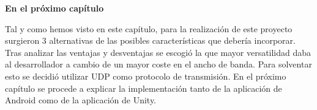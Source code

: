 \bigskip
\Large{\textbf{En el pr\'oximo cap\'itulo}}\\
\normalsize


Tal y como hemos visto en este cap\'itulo, para la realizaci\'on de este proyecto surgieron 3 alternativas de las posibles caracter\'isticas que deber\'ia incorporar. Tras analizar las ventajas y desventajas se escogi\'o la que mayor versatilidad daba al desarrollador a cambio de un mayor coste en el ancho de banda. Para solventar esto se decidi\'o utilizar UDP como protocolo de transmisi\'on. En el pr\'oximo cap\'itulo se procede a explicar la implementaci\'on tanto de la aplicaci\'on de Android como de  la aplicaci\'on de Unity. 


